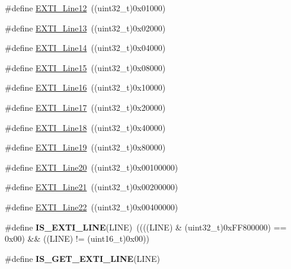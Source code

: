 \begin{DoxyCompactItemize}
\item 
\#define \hyperlink{group___e_x_t_i___lines_gab73a0a31f1814118955099b9dd3bdfef}{E\-X\-T\-I\-\_\-\-Line12}~((uint32\-\_\-t)0x01000)
\item 
\#define \hyperlink{group___e_x_t_i___lines_gae382388ac34b78917a7bd06562e35c42}{E\-X\-T\-I\-\_\-\-Line13}~((uint32\-\_\-t)0x02000)
\item 
\#define \hyperlink{group___e_x_t_i___lines_ga7b3821ad1b7a00b49c27075688f48101}{E\-X\-T\-I\-\_\-\-Line14}~((uint32\-\_\-t)0x04000)
\item 
\#define \hyperlink{group___e_x_t_i___lines_gafc5ea85d1fc095a855fde8977a338c4c}{E\-X\-T\-I\-\_\-\-Line15}~((uint32\-\_\-t)0x08000)
\item 
\#define \hyperlink{group___e_x_t_i___lines_ga21326db7db8ca614c746b7f52dc45ead}{E\-X\-T\-I\-\_\-\-Line16}~((uint32\-\_\-t)0x10000)
\item 
\#define \hyperlink{group___e_x_t_i___lines_ga3e0fc18bc0722adc09605e3093b24c6a}{E\-X\-T\-I\-\_\-\-Line17}~((uint32\-\_\-t)0x20000)
\item 
\#define \hyperlink{group___e_x_t_i___lines_ga6cdf346a3e7a3c8dbb036aca6741207c}{E\-X\-T\-I\-\_\-\-Line18}~((uint32\-\_\-t)0x40000)
\item 
\#define \hyperlink{group___e_x_t_i___lines_ga49ac0744621f88d432d85838483ad1de}{E\-X\-T\-I\-\_\-\-Line19}~((uint32\-\_\-t)0x80000)
\item 
\#define \hyperlink{group___e_x_t_i___lines_ga3ebc4564ac4ca4e1613f98d81a707f2a}{E\-X\-T\-I\-\_\-\-Line20}~((uint32\-\_\-t)0x00100000)
\item 
\#define \hyperlink{group___e_x_t_i___lines_ga273edacd18e521e5a702c642c5b824af}{E\-X\-T\-I\-\_\-\-Line21}~((uint32\-\_\-t)0x00200000)
\item 
\#define \hyperlink{group___e_x_t_i___lines_gabc65f8a90a3d5595896505ef2c59bec6}{E\-X\-T\-I\-\_\-\-Line22}~((uint32\-\_\-t)0x00400000)
\item 
\hypertarget{group___e_x_t_i___lines_gaade8b8717a1d78f83d3cf180e2817557}{\#define {\bfseries I\-S\-\_\-\-E\-X\-T\-I\-\_\-\-L\-I\-N\-E}(L\-I\-N\-E)~((((L\-I\-N\-E) \& (uint32\-\_\-t)0x\-F\-F800000) == 0x00) \&\& ((\-L\-I\-N\-E) != (uint16\-\_\-t)0x00))}\label{group___e_x_t_i___lines_gaade8b8717a1d78f83d3cf180e2817557}

\item 
\#define {\bfseries I\-S\-\_\-\-G\-E\-T\-\_\-\-E\-X\-T\-I\-\_\-\-L\-I\-N\-E}(L\-I\-N\-E)
\end{DoxyCompactItemize}


